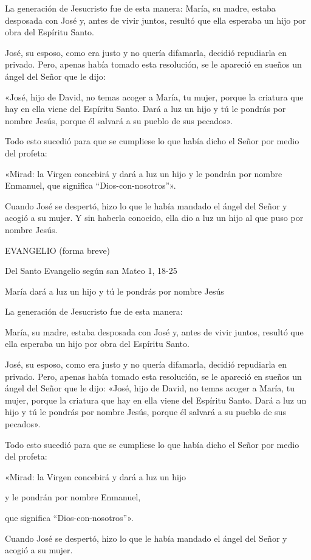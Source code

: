 \documentclass[]{article}
\begin{document}
La generación de Jesucristo fue de esta manera: María, su madre, estaba
desposada con José y, antes de vivir juntos, resultó que ella esperaba
un hijo por obra del Espíritu Santo.

José, su esposo, como era justo y no quería difamarla, decidió
repudiarla en privado. Pero, apenas había tomado esta resolución, se le
apareció en sueños un ángel del Señor que le dijo:

«José, hijo de David, no temas acoger a María, tu mujer, porque la
criatura que hay en ella viene del Espíritu Santo. Dará a luz un hijo y
tú le pondrás por nombre Jesús, porque él salvará a su pueblo de sus
pecados».

Todo esto sucedió para que se cumpliese lo que había dicho el Señor por
medio del profeta:

«Mirad: la Virgen concebirá y dará a luz un hijo y le pondrán por nombre
Enmanuel, que significa ``Dios-con-nosotros''».

Cuando José se despertó, hizo lo que le había mandado el ángel del Señor
y acogió a su mujer. Y sin haberla conocido, ella dio a luz un hijo al
que puso por nombre Jesús.

EVANGELIO (forma breve)

Del Santo Evangelio según san Mateo 1, 18-25

María dará a luz un hijo y tú le pondrás por nombre Jesús

La generación de Jesucristo fue de esta manera:

María, su madre, estaba desposada con José y, antes de vivir juntos,
resultó que ella esperaba un hijo por obra del Espíritu Santo.

José, su esposo, como era justo y no quería difamarla, decidió
repudiarla en privado. Pero, apenas había tomado esta resolución, se le
apareció en sueños un ángel del Señor que le dijo: «José, hijo de David,
no temas acoger a María, tu mujer, porque la criatura que hay en ella
viene del Espíritu Santo. Dará a luz un hijo y tú le pondrás por nombre
Jesús, porque él salvará a su pueblo de sus pecados».

Todo esto sucedió para que se cumpliese lo que había dicho el Señor por
medio del profeta:

«Mirad: la Virgen concebirá y dará a luz un hijo

y le pondrán por nombre Enmanuel,

que significa ``Dios-con-nosotros''».

Cuando José se despertó, hizo lo que le había mandado el ángel del Señor
y acogió a su mujer.
\end{document}
